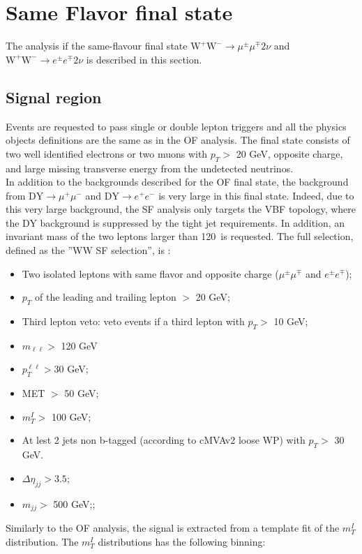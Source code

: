\section{Same Flavor final state}\label{sec:SF}
The analysis if the same-flavour final state $\mathrm{W^+W^-}\to \mu^{\pm}
\mu^{\mp}  2\nu$ and  $\mathrm{W^+W^-}\to e^{\pm} e^{\mp}  2\nu$ is described
in this section. \\

\subsection{Signal region}
Events are requested to pass single or double lepton triggers and all the
physics objects definitions are the same as in the OF analysis.
The final state consists of two well identified electrons or two muons with
$p_T >$ 20 GeV, opposite charge, and large missing transverse energy from the undetected neutrinos.\\
In addition to the backgrounds described for the OF final state, the
background from $\mathrm{DY}\to \mu^{+} \mu^{-}$ and
$\mathrm{DY}\to e^{+} e^{-}$ is very large in this final state.
Indeed, due to this very large background, the SF analysis only targets the
VBF topology, where the DY background is suppressed by the tight 
jet requirements. In addition, an invariant mass of the two leptons larger
than 120~\GeV is requested.
The full selection, defined as the ''WW SF selection'', is :

\begin{itemize}
\item Two isolated leptons with same flavor and opposite charge ($\mu ^{\pm} \mu^{\mp}$ and $e^{\pm} e^{\mp}$);
\item $p_T$ of the leading and trailing lepton $>$ 20 GeV;
\item Third lepton veto: veto events if a third lepton with $p_T  >$ 10 GeV;
\item  $m_{\ell \ell} >$ 120 GeV 
\item $p_T^{\ell \ell} >$30 GeV;
\item MET $>$ 50 GeV;
\item $m_T^I >$ 100 GeV;
\item At lest 2 jets non b-tagged (according to cMVAv2 loose WP) with $p_T >$ 30 GeV.
\item $\Delta \eta_{jj} > 3.5$;
\item $m_{jj} >$ 500 GeV;;
\end{itemize}


Similarly to the OF analysis, the signal is extracted from a template fit of
the $m_T^I$ distribution.
The $m_T^I$ distributions has the following binning:

